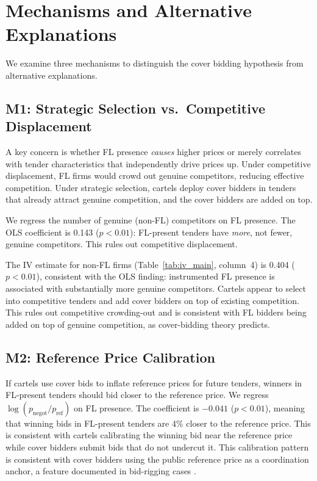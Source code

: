 \section{Mechanisms and Alternative Explanations}
\label{sec:mechanisms}

We examine three mechanisms to distinguish the cover bidding hypothesis
from alternative explanations.

\subsection{M1: Strategic Selection vs.\ Competitive Displacement}

A key concern is whether FL presence \emph{causes} higher prices or
merely correlates with tender characteristics that independently drive
prices up. Under competitive displacement, FL firms would crowd out
genuine competitors, reducing effective competition. Under strategic
selection, cartels deploy cover bidders in tenders that already attract
genuine competition, and the cover bidders are added on top.

We regress the number of genuine (non-FL) competitors on FL presence.
The OLS coefficient is 0.143 ($p < 0.01$): FL-present tenders have
\emph{more}, not fewer, genuine competitors. This rules out competitive
displacement.

The IV estimate for non-FL firms (Table~\ref{tab:iv_main}, column~4) is
0.404 ($p < 0.01$), consistent with the OLS finding: instrumented FL presence %
is associated with substantially more genuine competitors. Cartels
appear to select into competitive tenders and add cover bidders on top
of existing competition. This rules out competitive crowding-out and is %
consistent with FL bidders being added on top of genuine competition, as
cover-bidding theory predicts.

\subsection{M2: Reference Price Calibration}

If cartels use cover bids to inflate reference prices for future
tenders, winners in FL-present tenders should bid closer to the
reference price. We regress $\log(p_{\text{negot}} / p_{\text{ref}})$ on
FL presence. The coefficient is $-0.041$ ($p < 0.01$), meaning
that winning bids in FL-present tenders are 4\% closer to the reference
price. This is consistent with cartels calibrating the winning bid near
the reference price while cover bidders submit bids that do not
undercut it. This calibration pattern is consistent with cover bidders %
using the public reference price as a coordination anchor, a feature
documented in bid-rigging cases \citep{marshall2012economics}.

